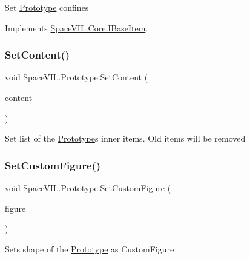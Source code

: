 Set \mbox{\hyperlink{class_space_v_i_l_1_1_prototype}{Prototype}} confines 



Implements \mbox{\hyperlink{interface_space_v_i_l_1_1_core_1_1_i_base_item}{Space\+V\+I\+L.\+Core.\+I\+Base\+Item}}.

\mbox{\label{class_space_v_i_l_1_1_prototype_aae3089e9f3585ccbf1b5a935cf0c0b27}} 
\subsubsection{\texorpdfstring{Set\+Content()}{SetContent()}}
{\footnotesize\ttfamily void Space\+V\+I\+L.\+Prototype.\+Set\+Content (\begin{DoxyParamCaption}\item[{List$<$ \mbox{\hyperlink{interface_space_v_i_l_1_1_core_1_1_i_base_item}{I\+Base\+Item}} $>$}]{content }\end{DoxyParamCaption})}



Set list of the \mbox{\hyperlink{class_space_v_i_l_1_1_prototype}{Prototype}}\textquotesingle{}s inner items. Old items will be removed 

\mbox{\label{class_space_v_i_l_1_1_prototype_a7c6bb62d8c795366532c7295b2b71d30}} 
\subsubsection{\texorpdfstring{Set\+Custom\+Figure()}{SetCustomFigure()}}
{\footnotesize\ttfamily void Space\+V\+I\+L.\+Prototype.\+Set\+Custom\+Figure (\begin{DoxyParamCaption}\item[{\mbox{\hyperlink{class_space_v_i_l_1_1_decorations_1_1_custom_figure}{Custom\+Figure}}}]{figure }\end{DoxyParamCaption})}



Sets shape of the \mbox{\hyperlink{class_space_v_i_l_1_1_prototype}{Prototype}} as Custom\+Figure 

